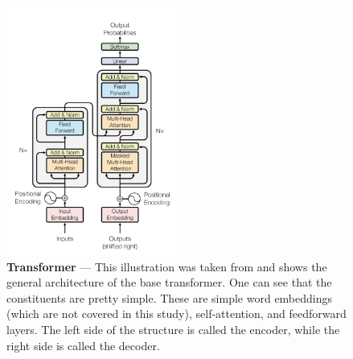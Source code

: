 \begin{figure}[ht]
    \centering
    \includegraphics[width=0.5\textwidth, scale=0.8]{figures/2-sota/transformer.png}
    \caption[Transformer]{\textbf{Transformer} --- This illustration was taken from \cite{vaswani_attention_2017} and shows the general architecture of the base transformer. One can see that the constituents are pretty simple. These are simple word embeddings (which are not covered in this study), self-attention, and feedforward layers. The left side of the structure is called the encoder, while the right side is called the decoder.}
    \label{fig:transformer}
\end{figure}